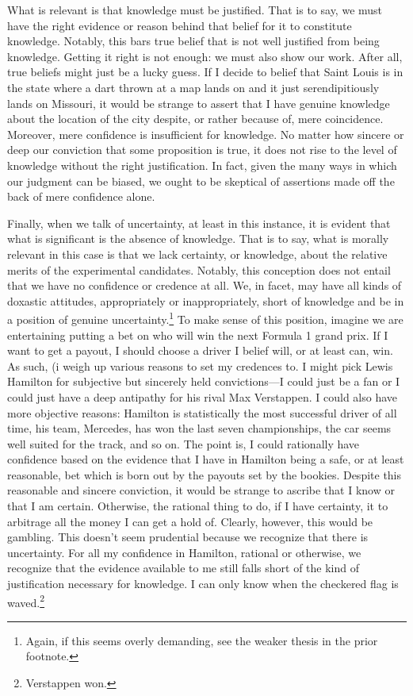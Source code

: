 \documentclass[letterpaper,notitlepage,12pt]{article}
\begin{document}
What is relevant is that knowledge must be justified.
That is to say, we must have the right evidence or reason behind that belief for
it to constitute knowledge.
Notably, this bars true belief that is not well justified from being knowledge.
Getting it right is not enough: we must also show our work.
After all, true beliefs might just be a lucky guess.
If I decide to belief that Saint Louis is in the state where a dart thrown at a
map lands on and it just serendipitiously lands on Missouri, it would be strange
to assert that I have genuine knowledge about the location of the city despite,
or rather because of, mere coincidence.
Moreover, mere confidence is insufficient for knowledge.
No matter how sincere or deep our conviction that some proposition is true, it
does not rise to the level of knowledge without the right justification.
In fact, given the many ways in which our judgment can be biased, we ought to
be skeptical of assertions made off the back of mere confidence alone.

Finally, when we talk of uncertainty, at least in this instance, it is evident
that what is significant is the absence of knowledge.
That is to say, what is morally relevant in this case is that we lack certainty,
or knowledge, about the relative merits of the experimental candidates.
Notably, this conception does not entail that we have no confidence or credence
at all.
We, in facet, may have all kinds of doxastic attitudes, appropriately or
inappropriately, short of knowledge and be in a position of genuine
uncertainty.\footnote{Again, if this seems overly demanding, see the weaker
thesis in the prior footnote.}
To make sense of this position, imagine we are entertaining putting a bet on who
will win the next Formula 1 grand prix.
If I want to get a payout, I should choose a driver I belief will, or at least
can, win.
As such, (i weigh up various reasons to set my credences to.
I might pick Lewis Hamilton for subjective but sincerely held convictions---I
could just be a fan or I could just have a deep antipathy for his rival Max
Verstappen.
I could also have more objective reasons: Hamilton is statistically the most
successful driver of all time, his team, Mercedes, has won the last seven
championships, the car seems well suited for the track, and so on.
The point is, I could rationally have confidence based on the evidence that I
have in Hamilton being a safe, or at least reasonable, bet which is born out by
the payouts set by the bookies.
Despite this reasonable and sincere conviction, it would be strange to ascribe
that I know or that I am certain. 
Otherwise, the rational thing to do, if I have certainty, it to arbitrage all
the money I can get a hold of.
Clearly, however, this would be gambling.
This doesn't seem prudential because we recognize that there is uncertainty.
For all my confidence in Hamilton, rational or otherwise, we recognize that the
evidence available to me still falls short of the kind of justification
necessary for knowledge.
I can only know when the checkered flag is waved.\footnote{Verstappen won.}
\end{document}

